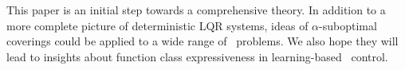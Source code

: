 This paper is an initial step towards a comprehensive theory.
In addition to a more complete picture of deterministic LQR systems,
ideas of $\alpha$-suboptimal coverings could be applied to a wide range of \multienv\ problems.
We also hope they will lead to insights
about function class expressiveness in learning-based \multienv\ control.



